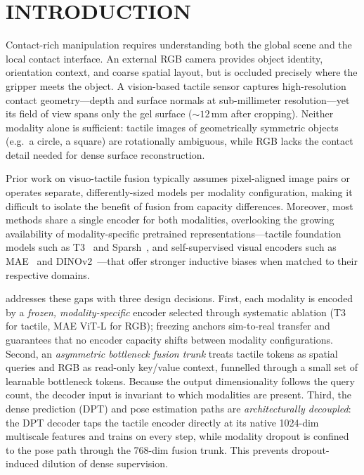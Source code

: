 \section{INTRODUCTION}

Contact-rich manipulation requires understanding both the global scene and the
local contact interface. An external RGB camera provides object identity,
orientation context, and coarse spatial layout, but is occluded precisely where
the gripper meets the object. A vision-based tactile sensor captures
high-resolution contact geometry---depth and surface normals at sub-millimeter
resolution---yet its field of view spans only the gel surface (${\sim}12$\,mm
after cropping). Neither modality alone is sufficient: tactile images of
geometrically symmetric objects (e.g.\ a circle, a square) are rotationally
ambiguous, while RGB lacks the contact detail needed for dense surface
reconstruction.

Prior work on visuo-tactile fusion typically assumes pixel-aligned image pairs
or operates separate, differently-sized models per modality configuration,
making it difficult to isolate the benefit of fusion from capacity
differences. Moreover, most methods share a single encoder for both
modalities, overlooking the growing availability of modality-specific
pretrained representations---tactile foundation models such as
T3~\cite{zhao2024transferable} and Sparsh~\cite{higuera2024sparsh}, and
self-supervised visual encoders such as MAE~\cite{he2022mae} and
DINOv2~\cite{oquab2023dinov2}---that offer stronger inductive biases when
matched to their respective domains.

\method{} addresses these gaps with three design decisions.
%
First, each modality is encoded by a \emph{frozen, modality-specific} encoder
selected through systematic ablation (T3 for tactile, MAE ViT-L for RGB);
freezing anchors sim-to-real transfer and guarantees that no encoder capacity
shifts between modality configurations.
%
Second, an \emph{asymmetric bottleneck fusion trunk} treats tactile tokens as
spatial queries and RGB as read-only key/value context, funnelled through a
small set of learnable bottleneck tokens. Because the output dimensionality
follows the query count, the decoder input is invariant to which modalities
are present.
%
Third, the dense prediction (DPT) and pose estimation paths are
\emph{architecturally decoupled}: the DPT decoder taps the tactile encoder
directly at its native 1024-dim multiscale features and trains on every step,
while modality dropout is confined to the pose path through the 768-dim
fusion trunk. This prevents dropout-induced dilution of dense supervision.

